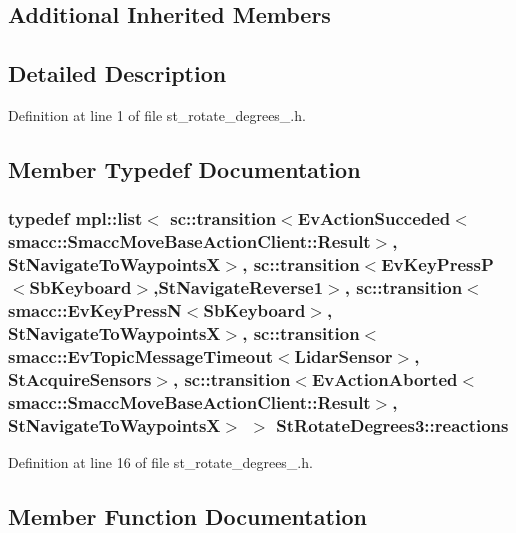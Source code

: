 \subsection*{Additional Inherited Members}


\subsection{Detailed Description}


Definition at line 1 of file st\+\_\+rotate\+\_\+degrees\+\_.\+h.



\subsection{Member Typedef Documentation}
\subsubsection[{\texorpdfstring{reactions}{reactions}}]{\setlength{\rightskip}{0pt plus 5cm}typedef mpl\+::list$<$ sc\+::transition$<$Ev\+Action\+Succeded$<$smacc\+::\+Smacc\+Move\+Base\+Action\+Client\+::\+Result$>$, {\bf St\+Navigate\+To\+WaypointsX}$>$, sc\+::transition$<$Ev\+Key\+PressP$<$Sb\+Keyboard$>$,{\bf St\+Navigate\+Reverse1}$>$, sc\+::transition$<${\bf smacc\+::\+Ev\+Key\+PressN}$<$Sb\+Keyboard$>$, {\bf St\+Navigate\+To\+WaypointsX}$>$, sc\+::transition$<${\bf smacc\+::\+Ev\+Topic\+Message\+Timeout}$<${\bf Lidar\+Sensor}$>$, {\bf St\+Acquire\+Sensors}$>$, sc\+::transition$<$Ev\+Action\+Aborted$<$smacc\+::\+Smacc\+Move\+Base\+Action\+Client\+::\+Result$>$, {\bf St\+Navigate\+To\+WaypointsX}$>$ $>$ {\bf St\+Rotate\+Degrees3\+::reactions}}\hypertarget{structStRotateDegrees3_a73a15fc4684d5a77b624ec65e58ffbbb}{}\label{structStRotateDegrees3_a73a15fc4684d5a77b624ec65e58ffbbb}


Definition at line 16 of file st\+\_\+rotate\+\_\+degrees\+\_.\+h.



\subsection{Member Function Documentation}

